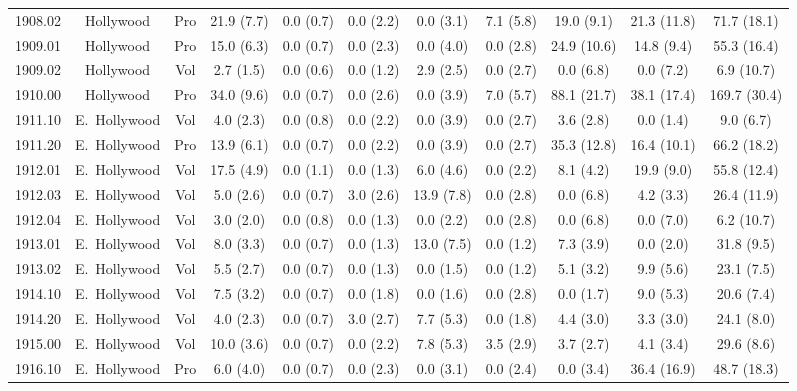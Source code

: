 \documentclass[11pt,twocolumn]{article}
\begin{document}
\begin{table}[t]
{\begin{tabular}{ccccccccccc}
1908.02 & Hollywood & Pro & 21.9 (7.7) &  0.0 (0.7) &  0.0 (2.2) &  0.0 (3.1) &  7.1 (5.8) & 19.0 (9.1) & 21.3 (11.8) &  71.7 (18.1) \\
1909.01 & Hollywood & Pro & 15.0 (6.3) &  0.0 (0.7) &  0.0 (2.3) &  0.0 (4.0) &  0.0 (2.8) & 24.9 (10.6) & 14.8 (9.4) &  55.3 (16.4) \\
1909.02 & Hollywood & Vol &  2.7 (1.5) &  0.0 (0.6) &  0.0 (1.2) &  2.9 (2.5) &  0.0 (2.7) &  0.0 (6.8) &  0.0 (7.2) &   6.9 (10.7) \\
1910.00 & Hollywood & Pro & 34.0 (9.6) &  0.0 (0.7) &  0.0 (2.6) &  0.0 (3.9) &  7.0 (5.7) & 88.1 (21.7) & 38.1 (17.4) & 169.7 (30.4) \\
1911.10 & E.~Hollywood & Vol &  4.0 (2.3) &  0.0 (0.8) &  0.0 (2.2) &  0.0 (3.9) &  0.0 (2.7) &  3.6 (2.8) &  0.0 (1.4) &   9.0 (6.7) \\
1911.20 & E.~Hollywood & Pro & 13.9 (6.1) &  0.0 (0.7) &  0.0 (2.2) &  0.0 (3.9) &  0.0 (2.7) & 35.3 (12.8) & 16.4 (10.1) &  66.2 (18.2) \\
1912.01 & E.~Hollywood & Vol & 17.5 (4.9) &  0.0 (1.1) &  0.0 (1.3) &  6.0 (4.6) &  0.0 (2.2) &  8.1 (4.2) & 19.9 (9.0) &  55.8 (12.4) \\
1912.03 & E.~Hollywood & Vol &  5.0 (2.6) &  0.0 (0.7) &  3.0 (2.6) & 13.9 (7.8) &  0.0 (2.8) &  0.0 (6.8) &  4.2 (3.3) &  26.4 (11.9) \\
1912.04 & E.~Hollywood & Vol &  3.0 (2.0) &  0.0 (0.8) &  0.0 (1.3) &  0.0 (2.2) &  0.0 (2.8) &  0.0 (6.8) &  0.0 (7.0) &   6.2 (10.7) \\
1913.01 & E.~Hollywood & Vol &  8.0 (3.3) &  0.0 (0.7) &  0.0 (1.3) & 13.0 (7.5) &  0.0 (1.2) &  7.3 (3.9) &  0.0 (2.0) &  31.8 (9.5) \\
1913.02 & E.~Hollywood & Vol &  5.5 (2.7) &  0.0 (0.7) &  0.0 (1.3) &  0.0 (1.5) &  0.0 (1.2) &  5.1 (3.2) &  9.9 (5.6) &  23.1 (7.5) \\
1914.10 & E.~Hollywood & Vol &  7.5 (3.2) &  0.0 (0.7) &  0.0 (1.8) &  0.0 (1.6) &  0.0 (2.8) &  0.0 (1.7) &  9.0 (5.3) &  20.6 (7.4) \\
1914.20 & E.~Hollywood & Vol &  4.0 (2.3) &  0.0 (0.7) &  3.0 (2.7) &  7.7 (5.3) &  0.0 (1.8) &  4.4 (3.0) &  3.3 (3.0) &  24.1 (8.0) \\
1915.00 & E.~Hollywood & Vol & 10.0 (3.6) &  0.0 (0.7) &  0.0 (2.2) &  7.8 (5.3) &  3.5 (2.9) &  3.7 (2.7) &  4.1 (3.4) &  29.6 (8.6) \\
1916.10 & E.~Hollywood & Pro &  6.0 (4.0) &  0.0 (0.7) &  0.0 (2.3) &  0.0 (3.1) &  0.0 (2.4) &  0.0 (3.4) & 36.4 (16.9) &  48.7 (18.3) \\

\end{tabular}}
\end{table}
\end{document}

